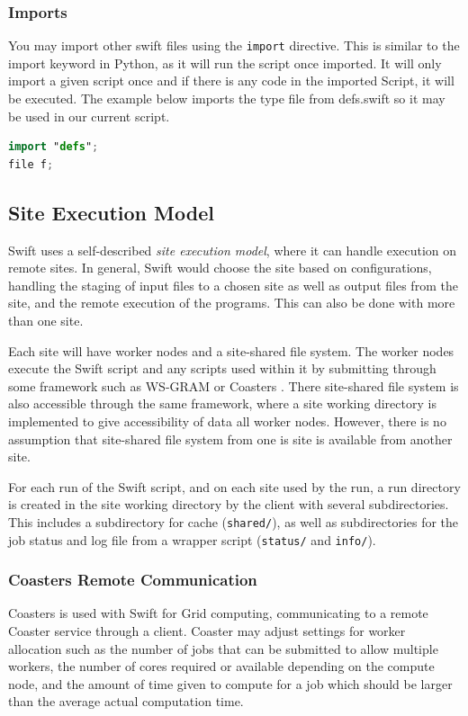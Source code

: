     \subsubsection{Imports}

        You may import other swift files using the \texttt{import} directive. This is similar to the import keyword in Python, as it will run the script once imported. It will only import a given script once and if there is any code in the imported Script, it will be executed. The example below imports the type file from defs.swift so it may be used in our current script.

        \begin{lstlisting}[language=swift]
import "defs";
file f;
        \end{lstlisting}

\subsection{Site Execution Model}

    Swift uses a self-described \textit{site execution model}, where it can handle execution on remote sites. In general, Swift would choose the site based on configurations, handling the staging of input files to a chosen site as well as output files from the site, and the remote execution of the programs. This can also be done with more than one site.

    Each site will have worker nodes and a site-shared file system. The worker nodes execute the Swift script and any scripts used within it by submitting through some framework such as WS-GRAM or Coasters \cite{hategan2011coasters}. There site-shared file system is also accessible through the same framework, where a site working directory is implemented to give accessibility of data all worker nodes. However, there is no assumption that site-shared file system from one is site is available from another site.

    For each run of the Swift script, and on each site used by the run, a run directory is created in the site working directory by the client with several subdirectories. This includes a subdirectory for cache (\texttt{shared/}), as well as subdirectories for the job status and log file from a wrapper script (\texttt{status/} and \texttt{info/}).

    \subsubsection{Coasters Remote Communication}\label{sec:coasters}
        Coasters is used with Swift for Grid computing, communicating to a remote Coaster service through a client. Coaster may adjust settings for worker allocation such as the number of jobs that can be submitted to allow multiple workers,  the number of cores required or available depending on the compute node, and the amount of time given to compute for a job which should be larger than the average actual computation time.

